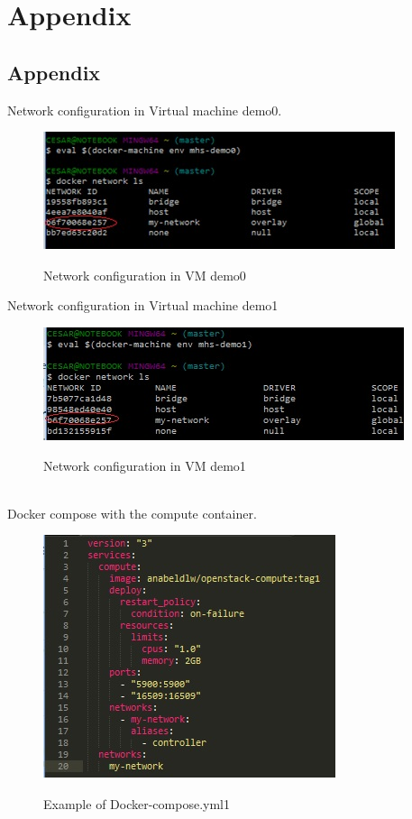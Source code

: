 
\chapter{Appendix}



\section{Appendix}

Network configuration in Virtual machine demo0.

\begin{figure}[bth]
{\includegraphics[width=1.2\linewidth]{gfx/demo0}}\caption[Network configuration in VM demo0]{Network configuration in VM demo0}
\label{fig:Network configuration in VM demo0}
\end{figure}

Network configuration in Virtual machine demo1

\begin{figure}[bth]
{\includegraphics[width=1\linewidth]{gfx/demo1}}\caption[demo1]{Network configuration in VM demo1}
\label{fig:Network configuration in VM demo1}
\end{figure}
\\

Docker compose with the compute container.
\begin{figure}[bth]
{\includegraphics[width=0.6\linewidth]{gfx/compose}}\caption[Docker-compose.yml]{Example of Docker-compose.yml1}
\label{fig:Example of docker-compose}
\end{figure}\\

